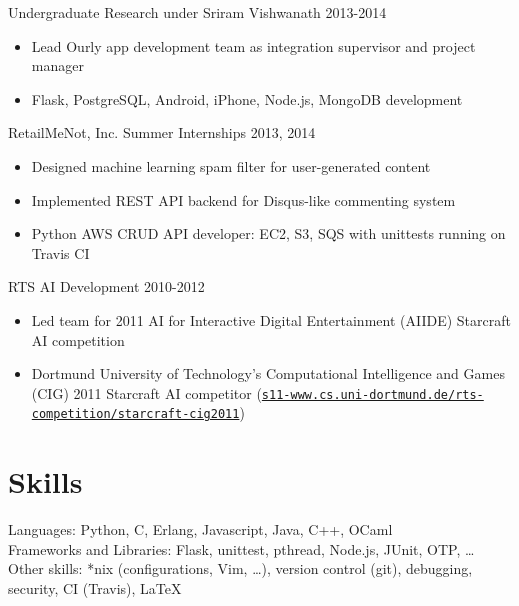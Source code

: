\documentclass[line,margin]{res}
\begin{document}
\begin{resume}
    \vspace{-6pt}
    Undergraduate Research under Sriram Vishwanath
    \hfill  2013-2014
        \begin{itemize} \itemsep -2pt
        \item Lead Ourly app development team as integration supervisor and project manager
        \item Flask, PostgreSQL, Android, iPhone, Node.js, MongoDB development
        \end{itemize}

    \vspace{-6pt}
    RetailMeNot, Inc. Summer Internships
    \hfill  2013, 2014
        \begin{itemize} \itemsep -2pt
        \item Designed machine learning spam filter for user-generated content
        \item Implemented REST API backend for Disqus-like commenting system
        \item Python AWS CRUD API developer: EC2, S3, SQS with unittests running on Travis CI
        \end{itemize}

    \vspace{-6pt}
    RTS AI Development
    \hfill  2010-2012
        \begin{itemize} \itemsep -2pt
        \item Led team for 2011 AI for Interactive Digital Entertainment (AIIDE) Starcraft AI competition  
        \item Dortmund University of Technology’s Computational Intelligence and Games (CIG) 2011 Starcraft AI
            competitor (\href{https://www.s11-www.cs.uni-dortmund.de/rts-competition/starcraft-cig2011}{\texttt{s11-www.cs.uni-dortmund.de/rts-competition/starcraft-cig2011}})
        \end{itemize}


\vspace{-8pt}
\section{Skills}
    \vspace{12pt} 
        Languages: Python, C, Erlang, Javascript, Java, C++, OCaml \\ 
        Frameworks and Libraries: Flask, unittest, pthread, Node.js, JUnit, OTP, \ldots \\
        Other skills: *nix (configurations, Vim, \ldots), version control (git), debugging, security, CI (Travis), \LaTeX



\end{resume}
\end{document}
